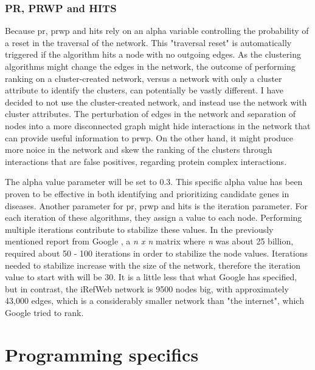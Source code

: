 \subsection{PR, PRWP and HITS}
Because \gls{pr}, \gls{prwp} and \gls{hits} rely on an alpha variable
controlling the probability of a reset in the traversal of the network. This
"traversal reset" is automatically triggered if the algorithm hits a node with
no outgoing edges. As the clustering algorithms might change the edges in the
network, the outcome of performing ranking on a cluster-created network, versus
a network with only a cluster attribute to identify the clusters, can
potentially be vastly different. I have decided to not use the cluster-created
network, and instead use the network with cluster attributes. The perturbation
of edges in the network and separation of nodes into a more disconnected graph
might hide interactions in the network that can provide useful information to
\gls{prwp}. On the other hand, it might produce more noice in the network and
skew the ranking of the clusters through interactions that are false positives,
regarding protein complex interactions. 

The alpha value parameter will be set to 0.3. This specific alpha value has been
proven to be effective in both identifying and prioritizing candidate genes in
diseases\cite{disease-prwp}. Another parameter for \gls{pr}, \gls{prwp} and
\gls{hits} is the iteration parameter. For each iteration of these algorithms,
they assign a value to each node. Performing multiple iterations contribute to
stabilize these values. In the previously mentioned report from Google
\cite{pr-parameters}, a \textit{n x n} matrix where \textit{n} was about 25
billion, required about 50 - 100 iterations in order to stabilize the node
values. Iterations needed to stabilize increase with the size of the network,
therefore the iteration value to start with will be 30. It is a little less that
what Google has specified, but in contrast, the iRefWeb network is 9500 nodes
big, with approximately 43,000 edges, which is a considerably smaller network
than "the internet", which Google tried to rank.

\chapter{Programming specifics}
